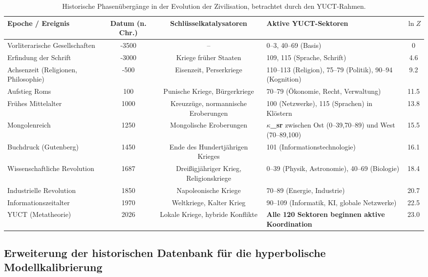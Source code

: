 \documentclass[12pt,a4paper]{article}
\theoremstyle{remark}
\begin{document}
	\begin{table}[htbp]
		\centering
		\caption{Historische Phasenübergänge in der Evolution der Zivilisation, betrachtet durch den YUCT-Rahmen.}
		\label{tab:historical-transitions}
		\scriptsize  
		\begin{tabular}{p{2.2cm} c c p{5.5cm} c}
			\toprule
			\textbf{Epoche / Ereignis} & \textbf{Datum (n. Chr.)} & \textbf{Schlüsselkatalysatoren} & \textbf{Aktive YUCT-Sektoren} & $\ln Z$ \\
			\midrule
			Vorliterarische Gesellschaften & -3500 & – & 0–3, 40–69 (Basis) & 0 \\
			Erfindung der Schrift & -3000 & Kriege früher Staaten & 109, 115 (Sprache, Schrift) & 4.6 \\
			Achsenzeit (Religionen, Philosophie) & -500 & Eisenzeit, Perserkriege & 110–113 (Religion), 75–79 (Politik), 90–94 (Kognition) & 9.2 \\
			Aufstieg Roms & 100 & Punische Kriege, Bürgerkriege & 70–79 (Ökonomie, Recht, Verwaltung) & 11.5 \\
			Frühes Mittelalter & 1000 & Kreuzzüge, normannische Eroberungen & 100 (Netzwerke), 115 (Sprachen) in Klöstern & 13.8 \\
			Mongolenreich & 1250 & Mongolische Eroberungen & \textbf{$\kappa$\_sr} zwischen Ost (0–39,70–89) und West (70–89,100) & 15.5 \\
			Buchdruck (Gutenberg) & 1450 & Ende des Hundertjährigen Krieges & 101 (Informationstechnologie) & 16.1 \\
			Wissenschaftliche Revolution & 1687 & Dreißigjähriger Krieg, Religionskriege & 0–39 (Physik, Astronomie), 40–69 (Biologie) & 18.4 \\
			Industrielle Revolution & 1850 & Napoleonische Kriege & 70–89 (Energie, Industrie) & 20.7 \\
			Informationszeitalter & 1970 & Weltkriege, Kalter Krieg & 90–109 (Informatik, KI, globale Netzwerke) & 22.5 \\
			YUCT (Metatheorie) & 2026 & Lokale Kriege, hybride Konflikte & \textbf{Alle 120 Sektoren beginnen aktive Koordination} & 23.0 \\
			\bottomrule
		\end{tabular}
	\end{table}
	
	\subsection{Erweiterung der historischen Datenbank für die hyperbolische Modellkalibrierung}
	\label{subsec:historical-data}
	
\end{document}
